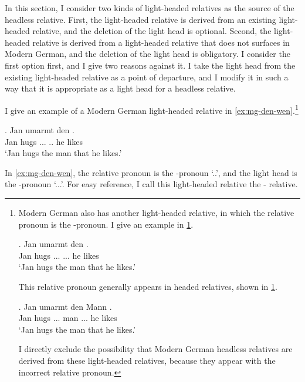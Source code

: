 In this section, I consider two kinds of light-headed relatives as the source of the headless relative.
First, the light-headed relative is derived from an existing light-headed relative, and the deletion of the light head is optional. Second, the light-headed relative is derived from a light-headed relative that does not surfaces in Modern German, and the deletion of the light head is obligatory.
I consider the first option first, and I give two reasons against it. I take the light head from the existing light-headed relative as a point of departure, and I modify it in such a way that it is appropriate as a light head for a headless relative.

I give an example of a Modern German light-headed relative in \ref{ex:mg-den-wen}.\footnote{
Modern German also has another light-headed relative, in which the relative pronoun is the -pronoun. I give an example in \ref{ex:mg-den-den}.

\exg. Jan umarmt den   .\\
Jan hugs ... ... he likes\\
`Jan hugs the man that he likes.'\label{ex:mg-den-den}

This relative pronoun generally appears in headed relatives, shown in \ref{ex:mg-den-headed}.

\exg. Jan umarmt den Mann   .\\
Jan hugs ... man ... he likes\\
`Jan hugs the man that he likes.'\label{ex:mg-den-headed}

I directly exclude the possibility that Modern German headless relatives are derived from these light-headed relatives, because they appear with the incorrect relative pronoun.
}

\exg. Jan umarmt den   .\\
Jan hugs ... .. he likes\\
`Jan hugs the man that he likes.'\label{ex:mg-den-wen}

In \ref{ex:mg-den-wen}, the relative pronoun is the -pronoun  `..', and the light head is the -pronoun  `...'. For easy reference, I call this light-headed relative the - relative.


